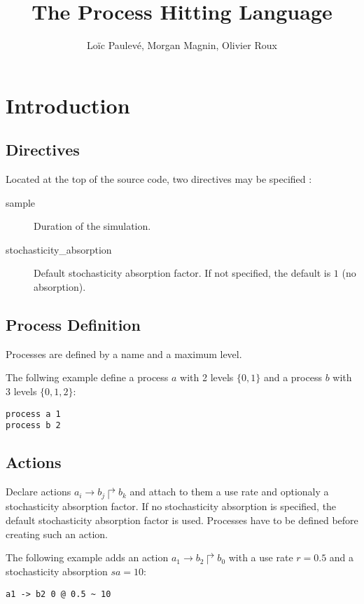 \documentclass[11pt]{article}
\title{The Process Hitting Language}
\author{Lo\"ic Paulev\'e, Morgan Magnin, Olivier Roux}
\newcommand{\hit}[3]{\mbox{$#1\rightarrow#2\Rsh#3$}}
\begin{document}
\maketitle

\section{Introduction}

\subsection{Directives}

Located at the top of the source code, two directives may be specified :
\begin{description}
\item[sample] Duration of the simulation.
\item[stochasticity\_absorption] Default stochasticity absorption factor. If not specified, the default is $1$ (no absorption).
\end{description}

\subsection{Process Definition}

Processes are defined by a name and a maximum level.

\noindent The follwing example define a process $a$ with 2 levels $\{0,1\}$ and a process $b$ with 3 levels $\{0,1,2\}$:
\begin{verbatim}
process a 1
process b 2
\end{verbatim}


\subsection{Actions}

Declare actions $\hit{a_i}{b_j}{b_k}$ and attach to them a use rate and optionaly a stochasticity absorption factor.
If no stochasticity absorption is specified, the default stochasticity absorption factor is used.
Processes have to be defined before creating such an action.

\noindent The following example adds an action $\hit{a_1}{b_2}{b_0}$ with a use rate $r=0.5$ and a stochasticity absorption $sa = 10$:
\begin{verbatim}
a1 -> b2 0 @ 0.5 ~ 10
\end{verbatim}
\end{document}

